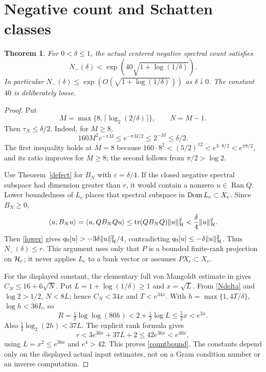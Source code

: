 \documentclass[11pt]{article}
\newtheorem{theorem}{Theorem}[section]\newtheorem{lemma}[theorem]{Lemma}\newtheorem{corollary}[theorem]{Corollary}
\begin{document}
\section{Negative count and Schatten classes}\label{count}
\begin{theorem}\label{main}
For $0<\delta\le1$, the actual centered negative spectral count satisfies
\begin{equation}\label{countbound}
 N_-(\delta)<\exp\!\left(40\sqrt{1+\log(1/\delta)}\right).
\end{equation}
In particular $N_-(\delta)\le\exp(O(\sqrt{1+\log(1/\delta)}))$ as $\delta\downarrow0$. The constant $40$ is deliberately loose.
\end{theorem}
\begin{proof}
Put
\begin{equation}\label{Ndelta}
 M=\max\{8,\lceil\log_2(2/\delta)\rceil\},\qquad N=M-1.
\end{equation}
Then $\tau_N\le\delta/2$. Indeed, for $M\ge8$,
\[160M^2e^{-\pi M}\le e^{-\pi M/2}\le2^{-M}\le\delta/2.
\]
The first inequality holds at $M=8$ because $160\cdot8^2<(5/2)^{12}<e^{3\cdot8/2}<e^{\pi8/2}$, and its ratio improves for $M\ge8$; the second follows from $\pi/2>\log2$.

Use Theorem~\ref{defect} for $B_N$ with $\varepsilon=\delta/4$. If the closed negative spectral subspace had dimension greater than $r$, it would contain a nonzero $u\in\operatorname{Ran}Q$. Lower boundedness of $L_c$ places that spectral subspace in $\operatorname{Dom} L_c\subset X_c$. Since $B_N\ge0$,
\[\langle u,B_Nu\rangle=\langle u,QB_NQu\rangle\le\operatorname{tr}(QB_NQ)\lVert u\rVert_{\mathcal H}^2<\frac\delta4\lVert u\rVert_{\mathcal H}^2.
\]
Then \eqref{lower} gives $q_0[u]>-3\delta\lVert u\rVert_{\mathcal H}^2/4$, contradicting $q_0[u]\le-\delta\lVert u\rVert_{\mathcal H}^2$. Thus $N_-(\delta)\le r$. This argument uses only that $P$ is a bounded finite-rank projection on $\mathcal H_c$; it never applies $L_c$ to a bank vector or assumes $P X_c\subset X_c$.

For the displayed constant, the elementary full von Mangoldt estimate in \cite{previous} gives $C_N\le16+6\sqrt N$. Put $L=1+\log(1/\delta)\ge1$ and $x=\sqrt L$. From \eqref{Ndelta} and $\log2>1/2$, $N<8L$; hence $C_N<34x$ and $T<e^{34x}$. With $h=\max\{1,4T/\delta\}$, $\log h<36L$, so
\[R=\tfrac12\log\log(80h)<2+\tfrac12\log L\le\tfrac52x<e^{2x}.
\]
Also $\tfrac12\log_2(2h)<37L$. The explicit rank formula gives
\[r<3e^{36x}+37L+2\le42e^{36x}<e^{40x},
\]
using $L=x^2\le e^{36x}$ and $e^4>42$. This proves \eqref{countbound}. The constants depend only on the displayed actual input estimates, not on a Gram condition number or an inverse computation.
\end{proof}
\end{document}
